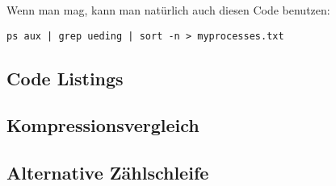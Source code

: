 \documentclass[12pt]{article}
\begin{document}
Wenn man mag, kann man natürlich auch diesen Code benutzen:
\begin{lstlisting}[caption=verkettete Pipes]
ps aux | grep ueding | sort -n > myprocesses.txt
\end{lstlisting}




\newpage

\begin{appendix}



\section{Code Listings}
\subsection{Kompressionsvergleich}
\label{listing:compression}
\lstset{language=bash}


\subsection{Alternative Zählschleife}
\label{listing:zahlen2}

\lstset{language=bash}



\end{appendix}
\end{document}

